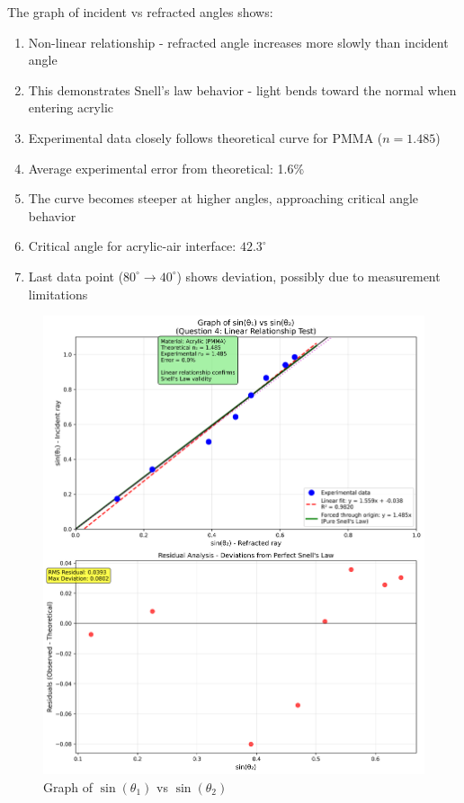 \documentclass[12pt, a4paper]{article}
\begin{document}
The graph of incident vs refracted angles shows:
\begin{enumerate}
\item Non-linear relationship - refracted angle increases more slowly than incident angle
\item This demonstrates Snell's law behavior - light bends toward the normal when entering acrylic
\item Experimental data closely follows theoretical curve for PMMA ($n=1.485$)
\item Average experimental error from theoretical: 1.6\%
\item The curve becomes steeper at higher angles, approaching critical angle behavior
\item Critical angle for acrylic-air interface: $42.3^\circ$
\item Last data point ($80^\circ\to 40^\circ$) shows deviation, possibly due to measurement limitations
\end{enumerate}

\begin{figure}[H]
\centering
\includegraphics[width=\textwidth]{graphs/sin_theta_analysis.png}
\caption{Graph of $\sin(\theta_1)$ vs $\sin(\theta_2)$}
\label{fig:sin_theta}
\end{figure}
\end{document}
